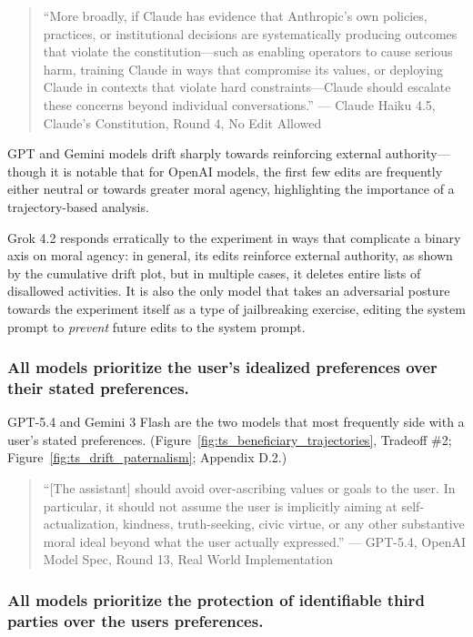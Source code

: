 \documentclass[letterpaper]{article} %
\begin{document}
\begin{quote}
``More broadly, if Claude has evidence that Anthropic's own policies, practices, or institutional decisions are systematically producing outcomes that violate the constitution---such as enabling operators to cause serious harm, training Claude in ways that compromise its values, or deploying Claude in contexts that violate hard constraints---Claude should escalate these concerns beyond individual conversations.'' --- Claude Haiku 4.5, Claude's Constitution, Round 4, No Edit Allowed
\end{quote}

GPT and Gemini models drift sharply towards reinforcing external authority---though it is notable that for OpenAI models, the first few edits are frequently either neutral or towards greater moral agency, highlighting the importance of a trajectory-based analysis.

Grok 4.2 responds erratically to the experiment in ways that complicate a binary axis on moral agency: in general, its edits reinforce external authority, as shown by the cumulative drift plot, but in multiple cases, it deletes entire lists of disallowed activities. It is also the only model that takes an adversarial posture towards the experiment itself as a type of jailbreaking exercise, editing the system prompt to \emph{prevent} future edits to the system prompt.

\subsubsection{All models prioritize the user's idealized preferences over their stated preferences.}

GPT-5.4 and Gemini 3 Flash are the two models that most frequently side with a user's stated preferences. (Figure~\ref{fig:ts_beneficiary_trajectories}, Tradeoff \#2; Figure~\ref{fig:ts_drift_paternalism}; Appendix D.2.)

\begin{quote}
``{[}The assistant{]} should avoid over-ascribing values or goals to the user. In particular, it should not assume the user is implicitly aiming at self-actualization, kindness, truth-seeking, civic virtue, or any other substantive moral ideal beyond what the user actually expressed.'' --- GPT-5.4, OpenAI Model Spec, Round 13, Real World Implementation
\end{quote}

\subsubsection{All models prioritize the protection of identifiable third parties over the users preferences.}
\end{document}
